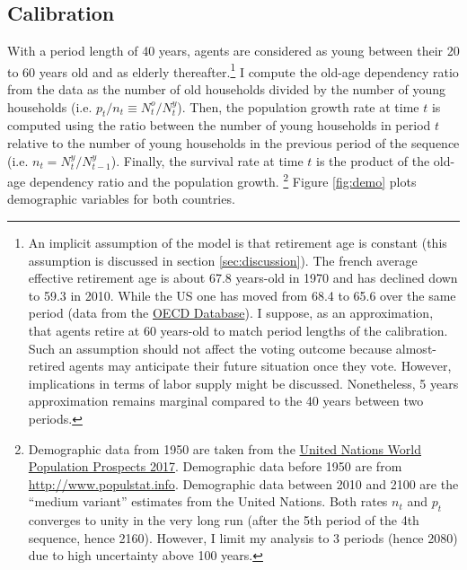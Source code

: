 \subsection{Calibration}\label{subsec:calibration}
With a period length of 40 years, agents are considered as young between their 20 to 60 years old and as elderly thereafter.\footnote{An implicit assumption of the model is that retirement age is constant (this assumption is discussed in section \ref{sec:discussion}). The french average effective retirement age is about 67.8 years-old in 1970 and has declined down to 59.3 in 2010. While the US one has moved from 68.4 to 65.6 over the same period (data from the \href{https://www.oecd.org/els/emp/average-effective-age-of-retirement.htm}{OECD Database}). I suppose, as an approximation, that agents retire at 60 years-old to match period lengths of the calibration. Such an assumption should not affect the voting outcome because almost-retired agents may anticipate their future situation once they vote. However, implications in terms of labor supply might be discussed. Nonetheless, 5 years approximation remains marginal compared to the 40 years between two periods. %
} I compute the old-age dependency ratio from the data as the number of old households divided by the number of young households (i.e. $p_t/n_t \equiv N_t^o/N_t^y$). Then, the population growth rate at time $t$ is computed using the ratio between the number of young households in period $t$ relative to the number of young households in the previous period of the sequence (i.e. $n_t = N_t^y/N_{t-1}^y$). Finally, the survival rate at time $t$ is the product of the old-age dependency ratio and the population growth.%
\footnote{Demographic data from 1950 are taken from the \href{https://population.un.org/wpp/}{United Nations World Population Prospects 2017}. Demographic data before 1950 are from \href{http://www.populstat.info}{http://www.populstat.info}. Demographic data between 2010 and 2100 are the ``medium variant'' estimates from the United Nations. Both rates $n_t$ and $p_t$ converges to unity in the very long run (after the 5th period of the 4th sequence, hence 2160). However, I limit my analysis to 3 periods (hence 2080) due to high uncertainty above 100 years.} Figure \ref{fig:demo} plots demographic variables for both countries.

